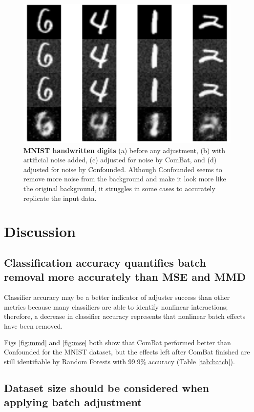 \documentclass[notitlepage]{article}
\begin{document}
\begin{figure}
	\centering
	\includegraphics[width=\columnwidth]{figures/rough/mnist}
	\caption{\textbf{MNIST handwritten digits} (a) before any adjustment,
	(b) with artificial noise added,
	(c) adjusted for noise by ComBat, and
	(d) adjusted for noise by Confounded.
	Although Confounded seems to remove more noise from the background and make it look more like the original background, it struggles in some cases to accurately replicate the input data.}
	\label{fig:mnist}
\end{figure}

\section{Discussion} \label{sec:discussion}

\subsection{Classification accuracy quantifies batch removal more accurately than MSE and MMD}

Classifier accuracy may be a better indicator of adjuster success than other metrics because many classifiers are able to identify nonlinear interactions;
therefore, a decrease in classifier accuracy represents that nonlinear batch effects have been removed.

Figs \ref{fig:mmd} and \ref{fig:mse} both show that ComBat performed better than Confounded for the MNIST dataset, but the effects left after ComBat finished are still identifiable by Random Forests with 99.9\% accuracy (Table \ref{tab:batch}).

\subsection{Dataset size should be considered when applying batch adjustment}
\end{document}
